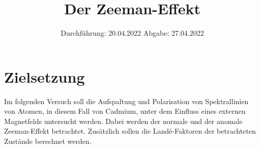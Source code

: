 
\usepackage{tikz}
\usepackage{lipsum}

\subject{V27}
\title{Der Zeeman-Effekt}
\date{
    Durchführung: 20.04.2022
     \hspace{3em}
    Abgabe: 27.04.2022
}


\maketitle
\thispagestyle{empty}
\tableofcontents
\newpage

\section{Zielsetzung}

    Im folgenden Versuch soll die Aufspaltung und Polarisation von Spektrallinien von Atomen,
    in diesem Fall von Cadmium,
    unter dem Einfluss eines externen Magnetfelds untersucht werden.
    Dabei werden der normale und der anomale Zeeman-Effekt betrachtet.
    Zusätzlich sollen die Landé-Faktoren der betrachteten Zustände berechnet werden.


\clearpage


\clearpage


\clearpage


\clearpage

\printbibliography


